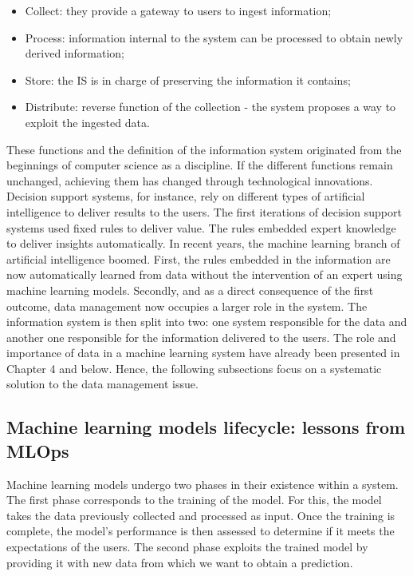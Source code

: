 \begin{itemize}
    \item Collect: they provide a gateway to users to ingest information;
    \item Process: information internal to the system can be processed to obtain newly derived information;
    \item Store: the IS is in charge of preserving the information it contains;
    \item Distribute: reverse function of the collection - the system proposes a way to exploit the ingested data.
\end{itemize}

These functions and the definition of the information system originated from the beginnings of computer science as a discipline.
If the different functions remain unchanged, achieving them has changed through technological innovations.
Decision support systems, for instance, rely on different types of artificial intelligence to deliver results to the users.
The first iterations of decision support systems used fixed rules to deliver value.
The rules embedded expert knowledge to deliver insights automatically.
In recent years, the machine learning branch of artificial intelligence boomed.
First, the rules embedded in the information are now automatically learned from data without the intervention of an expert using machine learning models.
Secondly, and as a direct consequence of the first outcome, data management now occupies a larger role in the system.
The information system is then split into two: one system responsible for the data and another one responsible for the information delivered to the users.
The role and importance of data in a machine learning system have already been presented in Chapter 4 and below.
Hence, the following subsections focus on a systematic solution to the data management issue.

\subsection{Machine learning models lifecycle: lessons from MLOps}
Machine learning models undergo two phases in their existence within a system.
The first phase corresponds to the training of the model.
For this, the model takes the data previously collected and processed as input.
Once the training is complete, the model's performance is then assessed to determine if it meets the expectations of the users.
The second phase exploits the trained model by providing it with new data from which we want to obtain a prediction.

